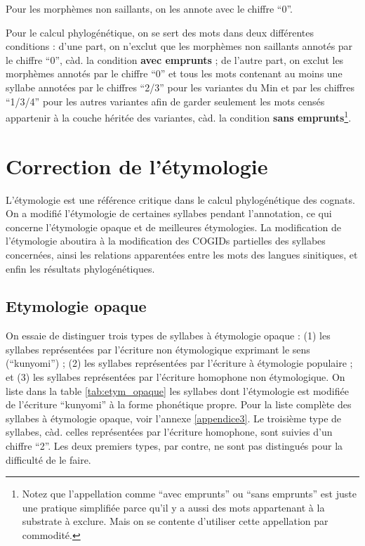 \documentclass{scrbook}
\newcounter{c}[subsubsection]
\begin{document}
\begin{sloppypar}
Pour les morphèmes non saillants, on les annote avec le chiffre ``0''.

Pour le calcul phylogénétique, on se sert des mots dans deux différentes conditions : d'une part, on n'exclut que les morphèmes non saillants annotés par le chiffre ``0'', càd. la condition \textbf{avec emprunts} ; de l'autre part, on exclut les morphèmes annotés par le chiffre ``0'' et tous les mots contenant au moins une syllabe annotées par le chiffres ``2/3'' pour les variantes du Min et par les chiffres ``1/3/4'' pour les autres variantes afin de garder seulement les mots censés appartenir à la couche héritée des variantes, càd. la condition \textbf{sans emprunts}\footnote{Notez que l'appellation comme ``avec emprunts'' ou ``sans emprunts'' est juste une pratique simplifiée parce qu'il y a aussi des mots appartenant à la substrate à exclure. Mais on se contente d'utiliser cette appellation par commodité.}.

\section{Correction de l'étymologie}\label{correction_etym}
L'étymologie est une référence critique dans le calcul phylogénétique des cognats. On a modifié l'étymologie de certaines syllabes pendant l'annotation, ce qui concerne l'étymologie opaque et de meilleures étymologies. La modification de l'étymologie aboutira à la modification des COGIDs partielles des syllabes concernées, ainsi les relations apparentées entre les mots des langues sinitiques, et enfin les résultats phylogénétiques.

\subsection{Etymologie opaque}
On essaie de distinguer trois types de syllabes à étymologie opaque : (1) les syllabes représentées par l'écriture non étymologique exprimant le sens (``kunyomi'') ; (2) les syllabes représentées par l'écriture à étymologie populaire ; et (3) les syllabes représentées par l'écriture homophone non étymologique. On liste dans la table \ref{tab:etym_opaque} les syllabes dont l'étymologie est modifiée de l'écriture ``kunyomi'' à la forme phonétique propre. Pour la liste complète des syllabes à étymologie opaque, voir l'annexe \ref{appendice3}. Le troisième type de syllabes, càd. celles représentées par l'écriture homophone, sont suivies d'un chiffre ``2''. Les deux premiers types, par contre, ne sont pas distingués pour la difficulté de le faire.


\end{sloppypar}
\end{document}
